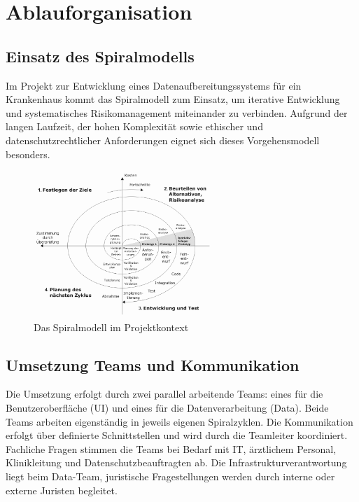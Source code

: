 {\let\clearpage\relax
\chapter{Ablauforganisation}}
\label{sec:ablauforganisation}

\section{Einsatz des Spiralmodells}
Im Projekt zur Entwicklung eines Datenaufbereitungssystems für ein Krankenhaus kommt das Spiralmodell zum Einsatz, um iterative Entwicklung und systematisches Risikomanagement miteinander zu verbinden. 
Aufgrund der langen Laufzeit, der hohen Komplexität sowie ethischer und datenschutzrechtlicher Anforderungen eignet sich dieses Vorgehensmodell besonders.

\begin{figure}[ht]
  \centering
  \includegraphics[width=0.6\textwidth]{fig/Spiralmodel_nach_Boehm.png}
  \caption{Das Spiralmodell im Projektkontext}
\end{figure}

\section{Umsetzung Teams und Kommunikation}
Die Umsetzung erfolgt durch zwei parallel arbeitende Teams: eines für die Benutzeroberfläche (UI) und eines für die Datenverarbeitung (Data). Beide Teams arbeiten eigenständig in jeweils eigenen Spiralzyklen. Die Kommunikation erfolgt über definierte Schnittstellen und wird durch die Teamleiter koordiniert. Fachliche Fragen stimmen die Teams bei Bedarf mit IT, ärztlichem Personal, Klinikleitung und Datenschutzbeauftragten ab. Die Infrastrukturverantwortung liegt beim Data-Team, juristische Fragestellungen werden durch interne oder externe Juristen begleitet.

